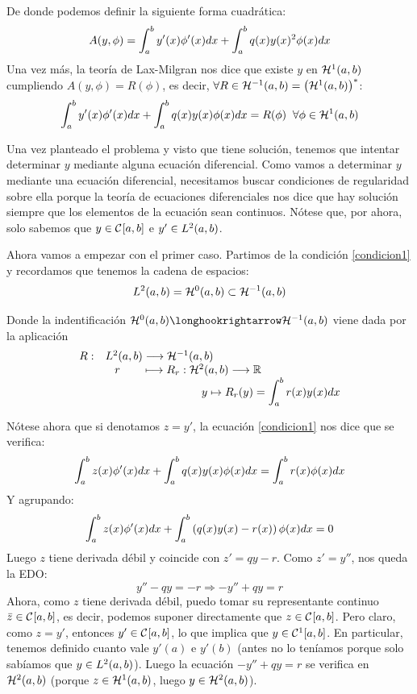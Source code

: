 De donde podemos definir la siguiente forma cuadrática: 
\[
A(y,\phi)=\integral{a}{b}{y'(x)\phi'(x)dx}+\integral{a}{b}{q(x)y(x)^2\phi(x)dx}
\]
Una vez más, la teoría de Lax-Milgran nos dice que existe $y$ en $\sobolev{1}$ cumpliendo $A(y,\phi)=R(\phi)$, es decir, $ \forall R\in \sobolev{-1}=\left(\sobolev{1}\right)^*$:
\begin{equation}
\label{condicion1}
\integral{a}{b}{y'(x)\phi'(x)dx}+\integral{a}{b}{q(x)y(x)\phi(x)dx}=R(\phi) \;\; \forall \phi\in\sobolev{1}
\end{equation}

Una vez planteado el problema y visto que tiene solución, tenemos que intentar determinar $y$ mediante alguna ecuación diferencial. Como vamos a determinar $y$ mediante una ecuación diferencial, necesitamos buscar condiciones de regularidad sobre ella porque la teoría de ecuaciones diferenciales nos dice que hay solución siempre que los elementos de la ecuación sean continuos. Nótese que, por ahora, solo sabemos que $y\in\continuas$ e $y'\in\lebesgue{2}$.
   
Ahora vamos a empezar con el primer caso. Partimos de la condición \eqref{condicion1} y recordamos que tenemos la cadena de espacios:
\[
\lebesgue{2} = \sobolev{0} \subset \sobolev{-1}
\]

Donde la indentificación $\sobolev{0}\longhookrightarrow\sobolev{-1}$ viene dada por la aplicación
\[
\begin{array}{ll}
R: & \lebesgue{2} \longrightarrow \sobolev{-1} \\
  &\;\;\; r \;\;\; \;\;\;\; \longmapsto    \funcion{R_r}{\sobolev{2}}{\R} \\
  & \hspace*{3cm} y \mapsto R_r(y)=\integral{a}{b}{r(x)y(x)dx} 
\end{array}
\]

Nótese ahora que si denotamos $z=y'$, la ecuación \eqref{condicion1} nos dice que se verifica:
\begin{equation}
\label{condicion2}
\integral{a}{b}{z(x)\phi'(x)dx}+\integral{a}{b}{q(x)y(x)\phi(x)dx}=\integral{a}{b}{r(x)\phi(x)dx}
\end{equation}
Y agrupando:
\[
\integral{a}{b}{z(x)\phi'(x)dx}+\integral{a}{b}{\left(q(x)y(x)-r(x)\right)\phi(x)dx}=0
\]
Luego $z$ tiene derivada débil y coincide con $z'=qy-r$. Como $z'=y''$, nos queda la EDO:
\[
y''-qy=-r \Rightarrow -y''+qy=r
\]
Ahora, como $z$ tiene derivada débil, puedo tomar su representante continuo $\bar{z}\in\continuas$, es decir, podemos suponer directamente que $z\in\continuas$. Pero claro, como $z=y'$, entonces $y'\in\continuas$, lo que implica que $y\in\continuas[1]$. En particular, tenemos definido cuanto vale $y'(a)$ e $y'(b)$ (antes no lo teníamos porque solo sabíamos que $y\in\lebesgue{2}$). Luego la ecuación $-y''+qy=r$ se verifica en $\sobolev{2}$ (porque $z\in\sobolev{1}$, luego $y\in\sobolev{2}$).

